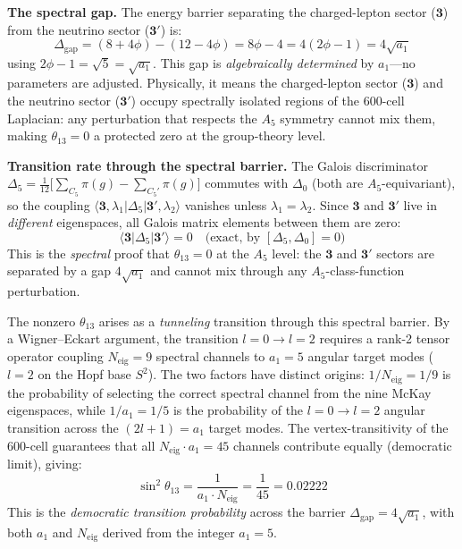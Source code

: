 \documentclass[12pt,a4paper]{article}
\theoremstyle{definition}
\begin{document}
\textbf{The spectral gap.}  The energy barrier separating the charged-lepton sector ($\mathbf{3}$) from the neutrino sector ($\mathbf{3'}$) is:
\begin{equation}
\Delta_{\text{gap}} = (8+4\phi) - (12-4\phi) = 8\phi - 4 = 4(2\phi - 1) = 4\sqrt{a_1}
\label{eq:spectral_gap}
\end{equation}
using $2\phi - 1 = \sqrt{5} = \sqrt{a_1}$.  This gap is \emph{algebraically determined} by $a_1$---no parameters are adjusted.  Physically, it means the charged-lepton sector ($\mathbf{3}$) and the neutrino sector ($\mathbf{3'}$) occupy spectrally isolated regions of the 600-cell Laplacian: any perturbation that respects the $A_5$ symmetry cannot mix them, making $\theta_{13} = 0$ a protected zero at the group-theory level.

\textbf{Transition rate through the spectral barrier.}
The Galois discriminator $\Delta_5 = \tfrac{1}{12}\bigl[\sum_{C_5}\pi(g) - \sum_{C_5'}\pi(g)\bigr]$ commutes with $\Delta_0$ (both are $A_5$-equivariant), so the coupling $\langle \mathbf{3},\lambda_1 | \Delta_5 | \mathbf{3'},\lambda_2 \rangle$ vanishes unless $\lambda_1 = \lambda_2$.  Since $\mathbf{3}$ and $\mathbf{3'}$ live in \emph{different} eigenspaces, all Galois matrix elements between them are zero:
\begin{equation}
\langle \mathbf{3} | \Delta_5 | \mathbf{3'} \rangle = 0 \quad \text{(exact, by $[\Delta_5, \Delta_0] = 0$)}
\end{equation}
This is the \emph{spectral} proof that $\theta_{13} = 0$ at the $A_5$ level: the $\mathbf{3}$ and $\mathbf{3'}$ sectors are separated by a gap $4\sqrt{a_1}$ and cannot mix through any $A_5$-class-function perturbation.

The nonzero $\theta_{13}$ arises as a \emph{tunneling} transition through this spectral barrier.  By a Wigner--Eckart argument, the transition $l = 0 \to l = 2$ requires a rank-2 tensor operator coupling $N_{\text{eig}} = 9$ spectral channels to $a_1 = 5$ angular target modes ($l = 2$ on the Hopf base $S^2$).  The two factors have distinct origins: $1/N_{\text{eig}} = 1/9$ is the probability of selecting the correct spectral channel from the nine McKay eigenspaces, while $1/a_1 = 1/5$ is the probability of the $l = 0 \to l = 2$ angular transition across the $(2l+1) = a_1$ target modes.  The vertex-transitivity of the 600-cell guarantees that all $N_{\text{eig}} \cdot a_1 = 45$ channels contribute equally (democratic limit), giving:
\begin{equation}
\boxed{\sin^2\theta_{13} = \frac{1}{a_1 \cdot N_{\text{eig}}} = \frac{1}{45} = 0.02222}
\label{eq:theta13}
\end{equation}
This is the \emph{democratic transition probability} across the barrier $\Delta_{\text{gap}} = 4\sqrt{a_1}$, with both $a_1$ and $N_{\text{eig}}$ derived from the integer $a_1 = 5$.
\end{document}
